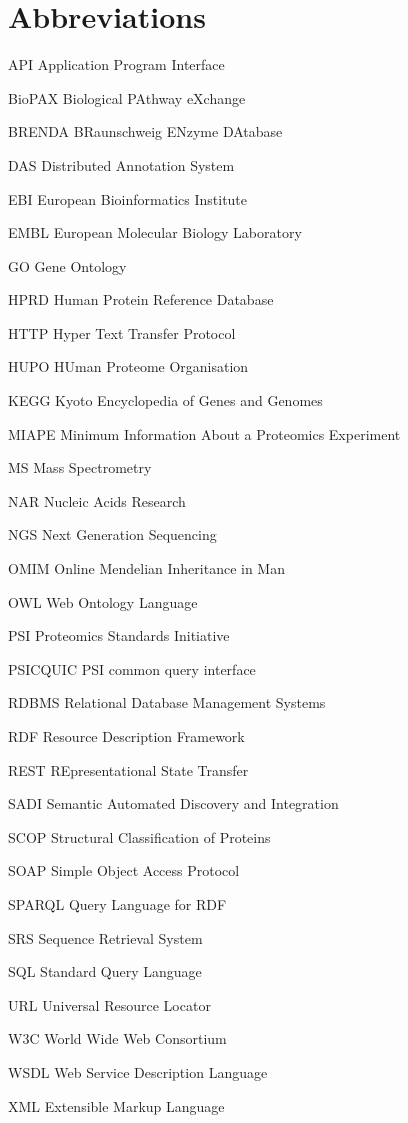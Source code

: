 \chapter*{Abbreviations}
\begin{abbreviations}
\setlength\itemsep{-0.5em}
	\item[API] Application Program Interface
	\item[BioPAX] Biological PAthway eXchange
	\item[BRENDA] BRaunschweig ENzyme DAtabase
	\item[DAS] Distributed Annotation System 
	\item[EBI] European Bioinformatics Institute
	\item[EMBL] European Molecular Biology Laboratory
	\item[GO] Gene Ontology
	\item[HPRD] Human Protein Reference Database
	\item[HTTP] Hyper Text Transfer Protocol
	\item[HUPO] HUman Proteome Organisation 
	\item[KEGG] Kyoto Encyclopedia of Genes and Genomes
	\item[MIAPE] Minimum Information About a Proteomics Experiment
	\item[MS] Mass Spectrometry
	\item[NAR] Nucleic Acids Research 
	\item[NGS] Next Generation Sequencing
	\item[OMIM] Online Mendelian Inheritance in Man
	\item[OWL] Web Ontology Language
	\item[PSI] Proteomics Standards Initiative
	\item[PSICQUIC] PSI common query interface
	\item[RDBMS] Relational Database Management Systems
	\item[RDF] Resource Description Framework
	\item[REST] REpresentational State Transfer
	\item[SADI] Semantic Automated Discovery and Integration
	\item[SCOP] Structural Classification of Proteins
	\item[SOAP] Simple Object Access Protocol
	\item[SPARQL] Query Language for RDF
	\item[SRS] Sequence Retrieval System
	\item[SQL] Standard Query Language
	\item[URL] Universal Resource Locator
	\item[W3C] World Wide Web Consortium
	\item[WSDL] Web Service Description Language
	\item[XML] Extensible Markup Language
\end{abbreviations}
